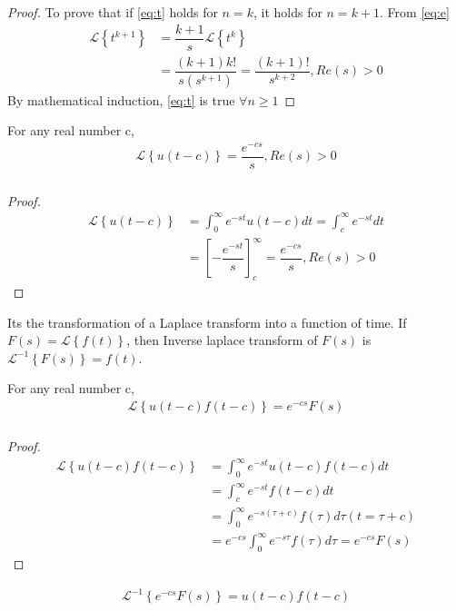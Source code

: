 \documentclass{beamer}
\providecommand{\brak}[1]{\ensuremath{\left(#1\right)}}
\providecommand{\sbrak}[1]{\ensuremath{{}\left[#1\right]}}
\providecommand{\brak}[1]{\ensuremath{\left(#1\right)}}
\providecommand{\cbrak}[1]{\ensuremath{\left\{#1\right\}}}
\begin{document}
\begin{frame}
\frametitle{}
\begin{proof}
To prove that if \eqref{eq:t} holds for $n=k$, it holds for $n=k+1$. From \eqref{eq:e}
\begin{align}
    \mathcal{L}\cbrak{t^{k+1}}&=\dfrac{k+1}{s}\mathcal{L}\cbrak{t^{k}}\\
    &=\dfrac{(k+1)k!}{s(s^{k+1})}=\dfrac{(k+1)!}{s^{k+2}}, Re(s)>0
\end{align}
By mathematical induction, \eqref{eq:t} is true $\forall n\geq 1$
\end{proof}
\begin{lemma}
For any real number c, 
\begin{align}
    \mathcal{L}\cbrak{u(t-c)}=\dfrac{e^{-cs}}{s}, Re(s)>0
    \label{eq:u}
\end{align}
\end{lemma}
\end{frame}

\begin{frame}
\frametitle{}
\begin{proof}
 \begin{align}
     \mathcal{L}\cbrak{u(t-c)}&=\int_{0}^{\infty}e^{-st}u(t-c)dt=\int_{c}^{\infty}e^{-st}dt\\
     &=\sbrak{-\dfrac{e^{-st}}{s}}_{c}^{\infty}=\dfrac{e^{-cs}}{s}, Re(s)>0
 \end{align}
\end{proof}
\begin{definition}
Its the transformation of a Laplace transform into a function of time. If $F(s)=\mathcal{L}\cbrak{f(t)}$, then Inverse laplace transform of $F(s)$ is $\mathcal{L}^{-1}\cbrak{F(s)}=f(t)$.
\end{definition}
\begin{lemma}
For any real number c,
\begin{align}
    \mathcal{L}\cbrak{u(t-c)f(t-c)}=e^{-cs}F(s)
    \label{eq:uf}
\end{align}
\end{lemma}
\end{frame}

\begin{frame}
\frametitle{}
\begin{proof}
\begin{align}
    \mathcal{L}\cbrak{u(t-c)f(t-c)}&=\int_{0}^{\infty}e^{-st}u(t-c)f(t-c)dt\\
    &=\int_{c}^{\infty}e^{-st}f(t-c)dt\\
    &=\int_{0}^{\infty}e^{-s(\tau+c)}f(\tau)d\tau \brak{t=\tau+c}\\
    &=e^{-cs}\int_{0}^{\infty}e^{-s\tau}f(\tau)d\tau=e^{-cs}F(s)
\end{align}
\end{proof}
\begin{corollary}
\begin{align}
    \mathcal{L}^{-1}\cbrak{e^{-cs}F(s)}=u(t-c)f(t-c)
\end{align}
\end{corollary}
\end{frame}
\end{document}
